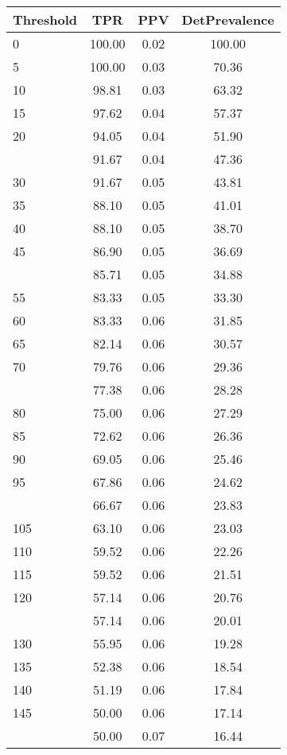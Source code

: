 \begin{table}[ht]
\centering
\begin{tabular}{lccc}
  \toprule
Threshold & TPR & PPV & DetPrevalence \\ 
  \midrule
0 & 100.00 & 0.02 & 100.00 \\ 
  5 & 100.00 & 0.03 & 70.36 \\ 
  10 & 98.81 & 0.03 & 63.32 \\ 
  15 & 97.62 & 0.04 & 57.37 \\ 
  20 & 94.05 & 0.04 & 51.90 \\ 
   \addlinespace
25 & 91.67 & 0.04 & 47.36 \\ 
  30 & 91.67 & 0.05 & 43.81 \\ 
  35 & 88.10 & 0.05 & 41.01 \\ 
  40 & 88.10 & 0.05 & 38.70 \\ 
  45 & 86.90 & 0.05 & 36.69 \\ 
   \addlinespace
50 & 85.71 & 0.05 & 34.88 \\ 
  55 & 83.33 & 0.05 & 33.30 \\ 
  60 & 83.33 & 0.06 & 31.85 \\ 
  65 & 82.14 & 0.06 & 30.57 \\ 
  70 & 79.76 & 0.06 & 29.36 \\ 
   \addlinespace
75 & 77.38 & 0.06 & 28.28 \\ 
  80 & 75.00 & 0.06 & 27.29 \\ 
  85 & 72.62 & 0.06 & 26.36 \\ 
  90 & 69.05 & 0.06 & 25.46 \\ 
  95 & 67.86 & 0.06 & 24.62 \\ 
   \addlinespace
100 & 66.67 & 0.06 & 23.83 \\ 
  105 & 63.10 & 0.06 & 23.03 \\ 
  110 & 59.52 & 0.06 & 22.26 \\ 
  115 & 59.52 & 0.06 & 21.51 \\ 
  120 & 57.14 & 0.06 & 20.76 \\ 
   \addlinespace
125 & 57.14 & 0.06 & 20.01 \\ 
  130 & 55.95 & 0.06 & 19.28 \\ 
  135 & 52.38 & 0.06 & 18.54 \\ 
  140 & 51.19 & 0.06 & 17.84 \\ 
  145 & 50.00 & 0.06 & 17.14 \\ 
   \addlinespace
150 & 50.00 & 0.07 & 16.44 \\ 

\end{tabular}
\end{table}
